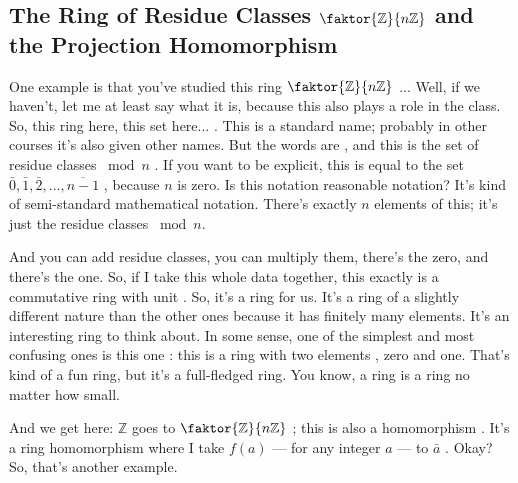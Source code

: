\subsection{The Ring of Residue Classes \texorpdfstring{$\faktor{\mathbb{Z}}{n\mathbb{Z}}$}{Z/nZ} and the Projection Homomorphism}

\begin{speech}[00:28:24 - 00:30:48]
One example is that you've studied this ring $\faktor{\mathbb{Z}}{n\mathbb{Z}}$ ... Well, if we haven't, let me at least say what it is, because this also plays a role in the class. So, this ring here, this set here... . This is a standard name; probably in other courses it's also given other names. But the words are , and this is the set of residue classes $\bmod n$ . If you want to be explicit, this is equal to the set $\bar{0}, \bar{1}, \bar{2}, \dots, \overline{n-1}$ , because $n$ is zero. Is this notation reasonable notation? It's kind of semi-standard mathematical notation. There's exactly $n$ elements of this; it's just the residue classes $\bmod n$.

And you can add residue classes, you can multiply them, there's the zero, and there's the one. So, if I take this whole data together, this exactly is a commutative ring with unit . So, it's a ring for us. It's a ring of a slightly different nature than the other ones because it has finitely many elements. It's an interesting ring to think about. In some sense, one of the simplest and most confusing ones is this one : this is a ring with two elements , zero and one. That's kind of a fun ring, but it's a full-fledged ring. You know, a ring is a ring no matter how small.

And we get here: $\mathbb{Z}$ goes to $\faktor{\mathbb{Z}}{n\mathbb{Z}}$ ; this is also a homomorphism . It's a ring homomorphism where I take $f(a)$ --- for any integer $a$ --- to $\bar{a}$ . Okay? So, that's another example.
\end{speech}

